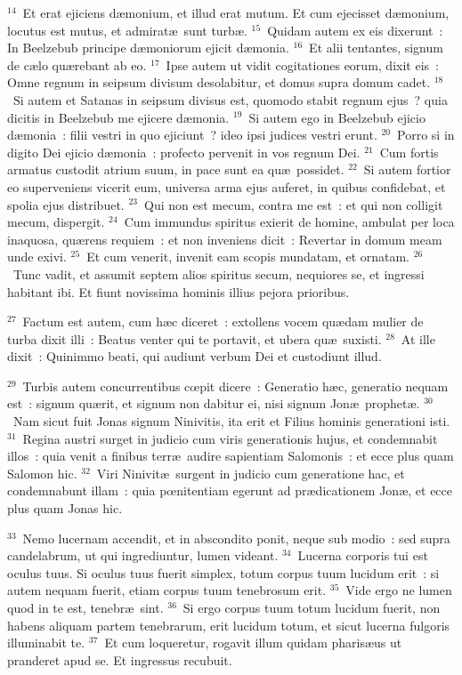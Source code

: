 ${}^{14}$~Et erat ejiciens d\ae monium, et illud erat mutum. Et cum ejecisset d\ae monium, locutus est mutus, et admirat\ae\ sunt turb\ae .
${}^{15}$~Quidam autem ex eis dixerunt~: In Beelzebub principe d\ae moniorum ejicit d\ae monia.
${}^{16}$~Et alii tentantes, signum de c\ae lo qu\ae rebant ab eo.
${}^{17}$~Ipse autem ut vidit cogitationes eorum, dixit eis~: Omne regnum in seipsum divisum desolabitur, et domus supra domum cadet.
${}^{18}$~Si autem et Satanas in seipsum divisus est, quomodo stabit regnum ejus~? quia dicitis in Beelzebub me ejicere d\ae monia.
${}^{19}$~Si autem ego in Beelzebub ejicio d\ae monia~: filii vestri in quo ejiciunt~? ideo ipsi judices vestri erunt.
${}^{20}$~Porro si in digito Dei ejicio d\ae monia~: profecto pervenit in vos regnum Dei.
${}^{21}$~Cum fortis armatus custodit atrium suum, in pace sunt ea qu\ae\ possidet.
${}^{22}$~Si autem fortior eo superveniens vicerit eum, universa arma ejus auferet, in quibus confidebat, et spolia ejus distribuet.
${}^{23}$~Qui non est mecum, contra me est~: et qui non colligit mecum, dispergit.
${}^{24}$~Cum immundus spiritus exierit de homine, ambulat per loca inaquosa, qu\ae rens requiem~: et non inveniens dicit~: Revertar in domum meam unde exivi.
${}^{25}$~Et cum venerit, invenit eam scopis mundatam, et ornatam.
${}^{26}$~Tunc vadit, et assumit septem alios spiritus secum, nequiores se, et ingressi habitant ibi. Et fiunt novissima hominis illius pejora prioribus.


${}^{27}$~Factum est autem, cum h\ae c diceret~: extollens vocem qu\ae dam mulier de turba dixit illi~: Beatus venter qui te portavit, et ubera qu\ae\ suxisti.
${}^{28}$~At ille dixit~: Quinimmo beati, qui audiunt verbum Dei et custodiunt illud.


${}^{29}$~Turbis autem concurrentibus cœpit dicere~: Generatio h\ae c, generatio nequam est~: signum qu\ae rit, et signum non dabitur ei, nisi signum Jon\ae\ prophet\ae .
${}^{30}$~Nam sicut fuit Jonas signum Ninivitis, ita erit et Filius hominis generationi isti.
${}^{31}$~Regina austri surget in judicio cum viris generationis hujus, et condemnabit illos~: quia venit a finibus terr\ae\ audire sapientiam Salomonis~: et ecce plus quam Salomon hic.
${}^{32}$~Viri Ninivit\ae\ surgent in judicio cum generatione hac, et condemnabunt illam~: quia pœnitentiam egerunt ad pr\ae dicationem Jon\ae , et ecce plus quam Jonas hic.


${}^{33}$~Nemo lucernam accendit, et in abscondito ponit, neque sub modio~: sed supra candelabrum, ut qui ingrediuntur, lumen videant.
${}^{34}$~Lucerna corporis tui est oculus tuus. Si oculus tuus fuerit simplex, totum corpus tuum lucidum erit~: si autem nequam fuerit, etiam corpus tuum tenebrosum erit.
${}^{35}$~Vide ergo ne lumen quod in te est, tenebr\ae\ sint.
${}^{36}$~Si ergo corpus tuum totum lucidum fuerit, non habens aliquam partem tenebrarum, erit lucidum totum, et sicut lucerna fulgoris illuminabit te.
${}^{37}$~Et cum loqueretur, rogavit illum quidam pharis\ae us ut pranderet apud se. Et ingressus recubuit.


